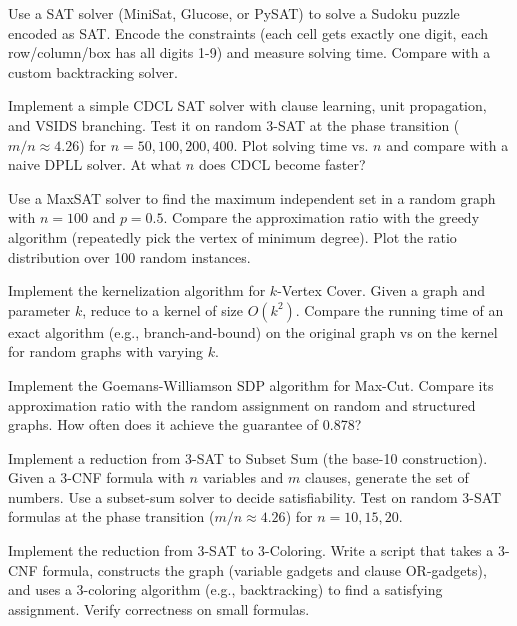 \begin{exercise}[Computational]
Use a SAT solver (MiniSat, Glucose, or PySAT) to solve a Sudoku puzzle encoded as SAT. Encode the constraints (each cell gets exactly one digit, each row/column/box has all digits 1-9) and measure solving time. Compare with a custom backtracking solver.
\end{exercise}

\begin{exercise}[Computational]
Implement a simple CDCL SAT solver with clause learning, unit propagation, and VSIDS branching. Test it on random 3-SAT at the phase transition ($m/n \approx 4.26$) for $n=50,100,200,400$. Plot solving time vs. $n$ and compare with a naive DPLL solver. At what $n$ does CDCL become faster?
\end{exercise}

\begin{exercise}[Computational]
Use a MaxSAT solver to find the maximum independent set in a random graph with $n=100$ and $p=0.5$. Compare the approximation ratio with the greedy algorithm (repeatedly pick the vertex of minimum degree). Plot the ratio distribution over 100 random instances.
\end{exercise}

\begin{exercise}[Computational]
Implement the kernelization algorithm for $k$-Vertex Cover. Given a graph and parameter $k$, reduce to a kernel of size $O(k^2)$. Compare the running time of an exact algorithm (e.g., branch-and-bound) on the original graph vs on the kernel for random graphs with varying $k$.
\end{exercise}

\begin{exercise}[Computational]
Implement the Goemans-Williamson SDP algorithm for Max-Cut. Compare its approximation ratio with the random assignment on random and structured graphs. How often does it achieve the guarantee of 0.878?
\end{exercise}

\begin{exercise}[Computational]
Implement a reduction from 3-SAT to Subset Sum (the base-10 construction). Given a 3-CNF formula with $n$ variables and $m$ clauses, generate the set of numbers. Use a subset-sum solver to decide satisfiability. Test on random 3-SAT formulas at the phase transition ($m/n \approx 4.26$) for $n=10,15,20$.
\end{exercise}

\begin{exercise}[Computational]
Implement the reduction from 3-SAT to 3-Coloring. Write a script that takes a 3-CNF formula, constructs the graph (variable gadgets and clause OR-gadgets), and uses a 3-coloring algorithm (e.g., backtracking) to find a satisfying assignment. Verify correctness on small formulas.
\end{exercise}

